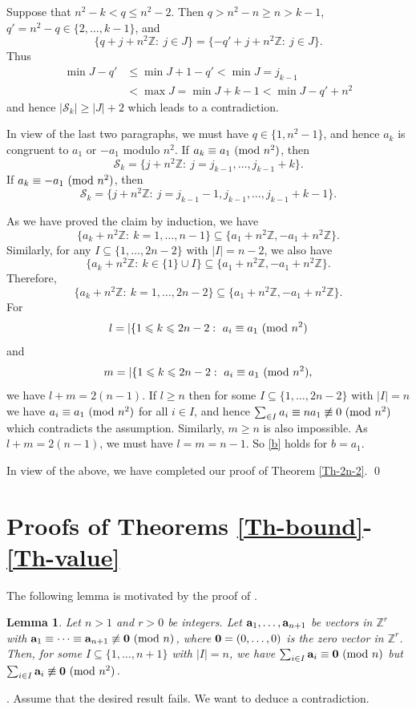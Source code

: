\documentclass[11pt,reqno]{amsart}
\def\pmod #1{\ ({\rm{mod}}\ #1)}
\def\Z{\mathbb Z}
\def\ls{\leqslant}
\def\gs{\geqslant}
\def\se {\subseteq}
\def\eq{\equiv}
\def\Proof{\noindent{\it Proof}}
\theoremstyle{plain}
\newtheorem{lemma}{Lemma}
\theoremstyle{definition}
\theoremstyle{remark}
\begin{document}
Suppose that  $n^2-k<q\ls n^2-2$. Then  $q>n^2-n\gs n>k-1$, $q'=n^2-q\in\{2,\ldots,k-1\}$, and
$$\{q+j+n^2\Z:\ j\in J\}=\{-q'+j+n^2\Z:\ j\in J\}.$$
Thus
\begin{align*}\min J-q'&\ls \min J+1-q'<\min J=j_{k-1}
\\&<\max J=\min J+k-1<\min J-q'+n^2
\end{align*}
and hence $|{\mathcal S}_k|\gs|J|+2$ which leads to a contradiction.

In view of the last two paragraphs, we must have $q\in\{1,n^2-1\}$, and hence $a_k$ is congruent to $a_1$ or $-a_1$ modulo $n^2$. If $a_k\eq a_1\pmod {n^2}$, then
$${\mathcal S}_k=\{j+n^2\Z:\ j=j_{k-1},\ldots,j_{k-1}+k\}.$$
If $a_k\eq -a_1\pmod {n^2}$, then
$${\mathcal S}_k=\{j+n^2\Z:\ j=j_{k-1}-1,j_{k-1},\ldots,j_{k-1}+k-1\}.$$

As we have proved the claim by induction, we have
$$\{a_k+n^2\Z:\ k=1,\ldots,n-1\}\se\{a_1+n^2\Z,-a_1+n^2\Z\}.$$
Similarly, for any $I\se\{1,\ldots,2n-2\}$ with $|I|=n-2$, we also have
$$\{a_k+n^2\Z:\ k\in\{1\}\cup I\}\se\{a_1+n^2\Z,-a_1+n^2\Z\}.$$
Therefore,
$$\{a_k+n^2\Z:\ k=1,\ldots,2n-2\}\se\{a_1+n^2\Z,-a_1+n^2\Z\}.$$
For
$$l=|\{1\ls k\ls 2n-2:\ a_i\eq a_1\pmod {n^2}$$
and $$m=|\{1\ls k\ls 2n-2:\ a_i\eq a_1\pmod {n^2},$$
we have $l+m=2(n-1)$. If $l\gs n$ then for some $I\se\{1,\ldots,2n-2\}$ with $|I|=n$
we have $a_i\eq a_1\pmod{n^2}$ for all $i\in I$, and hence $\sum_{\in I}a_i\eq na_1\not\eq0\pmod{n^2}$
which contradicts the assumption. Similarly, $m\gs n$ is also impossible. As $l+m=2(n-1)$, we must have $l=m=n-1$. So \eqref{b} holds for $b=a_1$.

In view of the above, we have completed our proof of Theorem \ref{Th-2n-2}. \qed



\section{Proofs of Theorems \ref{Th-bound}-\ref{Th-value}}
\setcounter{lemma}{0}
\setcounter{theorem}{0}
\setcounter{corollary}{0}
\setcounter{remark}{0}
\setcounter{equation}{0}

The following lemma is motivated by the proof of \cite[Lemma 3.4]{G25}.

\begin{lemma} \label{Lem2.1} Let $n>1$ and $r>0$ be integers. Let
${\bf a}_1,\ldots,{\bf a}_{n+1}$ be vectors in $\Z^r$ with ${\bf a}_1\eq\cdots\eq{\bf a}_{n+1}\not\eq {\bf 0}\pmod n$, where ${\bf 0}=(0,\ldots,0)$ is the zero vector in $\Z^r$.  Then, for some $I\se\{1,\ldots,n+1\}$ with $|I|=n$, we have
$\sum_{i\in I}{\bf a}_i\eq{\bf 0}\pmod n$ but $\sum_{i\in I}{\bf a}_i\not\eq{\bf 0}\pmod {n^2}$.
\end{lemma}
\Proof. Assume that the desired result fails. We want to deduce a contradiction.
\end{document}
